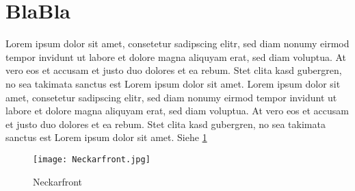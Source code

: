 \section{BlaBla}

Lorem ipsum dolor sit amet, consetetur sadipscing elitr, sed diam nonumy eirmod tempor invidunt ut labore et dolore magna aliquyam erat, sed diam voluptua. At vero eos et accusam et justo duo dolores et ea rebum. Stet clita kasd gubergren, no sea takimata sanctus est Lorem ipsum dolor sit amet. Lorem ipsum dolor sit amet, consetetur sadipscing elitr, sed diam nonumy eirmod tempor invidunt ut labore et dolore magna aliquyam erat, sed diam voluptua. At vero eos et accusam et justo duo dolores et ea rebum. Stet clita kasd gubergren, no sea takimata sanctus est Lorem ipsum dolor sit amet. Siehe \ref{fig:Neckarfront}

\begin{figure}
\center
\texttt{[image: Neckarfront.jpg]}
\caption{Neckarfront}
\label{fig:Neckarfront}
\end{figure}

